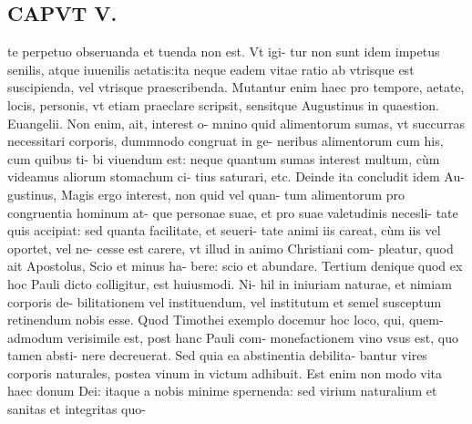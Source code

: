 \documentclass{article}
\begin{document}
\begin{pages}
\section*{CAPVT V. }
\marginpar{[ p.381 ]}\pstart te perpetuo obseruanda et tuenda non est. Vt igi- tur non sunt idem impetus senilis, atque iuuenilis aetatis:ita neque eadem vitae ratio ab vtrisque est suscipienda, vel vtrisque praescribenda. Mutantur enim haec pro tempore, aetate, locis, personis, vt etiam praeclare scripsit, sensitque Augustinus in quaestion. Euangelii. Non enim, ait, interest o- mnino quid alimentorum sumas, vt succurras necessitari corporis, dummnodo congruat in ge- neribus alimentorum cum his, cum quibus ti- bi viuendum est: neque quantum sumas interest multum, cùm videamus aliorum stomachum ci- tius saturari, etc. Deinde ita concludit idem Au- gustinus, Magis ergo interest, non quid vel quan- tum alimentorum pro congruentia hominum at- que personae suae, et pro suae valetudinis necesli- tate quis accipiat: sed quanta facilitate, et seueri- tate animi iis careat, cùm iis vel oportet, vel ne- cesse est carere, vt illud in animo Christiani com- pleatur, quod ait Apostolus, Scio et minus ha- bere: scio et abundare. Tertium denique quod ex hoc Pauli dicto colligitur, est huiusmodi. Ni- hil in iniuriam naturae, et nimiam corporis de- bilitationem vel instituendum, vel institutum et semel susceptum retinendum nobis esse. Quod Timothei exemplo docemur hoc loco, qui, quem- admodum verisimile est, post hanc Pauli com- monefactionem vino vsus est, quo tamen absti- nere decreuerat. Sed quia ea abstinentia debilita- bantur vires corporis naturales, postea vinum in victum adhibuit. Est enim non modo vita haec donum Dei: itaque a nobis minime spernenda: sed virium naturalium et sanitas et integritas quo-  \pend

\end{pages}
\end{document}
